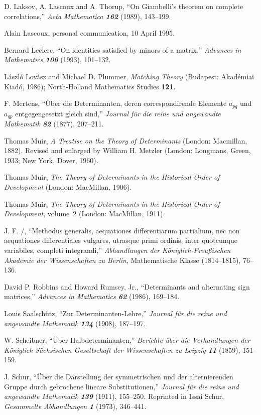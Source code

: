 {\bib
[\LLT]
D. Laksov, A. Lascoux and A. Thorup, ``On Giambelli's theorem on complete
correlations,'' {\sl Acta Mathematica\/ \bf162} (1989), 143--199.

\bib
[\Lasc] Alain Lascoux, personal communication, 10 April 1995.

\bib
[\Lec] 
Bernard Leclerc, ``On identities satisfied by minors of a matrix,''
{\sl Advances in Mathematics\/ \bf100} (1993), 101--132.

\bib
[\LP]
L\'aszl\'o Lov\'asz and Michael D. Plummer, {\sl Matching Theory\/} (Budapest:
Akad\'emiai Kiad\'o, 1986); North-Holland Mathematics Studies {\bf 121}.

\bib
[\Mert]
F. Mertens, ``\"Uber die Determinanten, deren correspondirende Elemente
$a_{pq}$ und~$a_{qp}$ ent\-gegen\-gesetzt gleich sind,'' 
{\sl Journal f\"ur die reine und angewandte Mathematik\/
\bf 82} (1877), 207--211.

\bib
[\Muirtreat]
Thomas Muir, {\sl A Treatise on the Theory of Determinants\/} (London:
Macmillan, 1882). Revised and enlarged by William H. Metzler (London:
Longmans, Green, 1933; New York, Dover, 1960).

\bib
[\Muir]
Thomas Muir, {\sl The Theory of Determinants in the Historical Order of
Development\/} (London: MacMillan, 1906).

\bib
[\Muirtwo]
Thomas Muir, {\sl The Theory of Determinants in the Historical Order of
Development}, volume~2 (London: MacMillan, 1911).

\bib
[\Pf]
J. F. \Pfaff/, ``Methodus generalis, aequationes differentiarum partialium, nec
non aequationes differentiales vulgares, utrasque primi ordinis, inter
quotcunque variabiles, completi integrandi,'' {\sl Abhandlungen der
K\"oniglich-Preu{\ss}ischen Akademie der Wissenschaften zu Berlin},
Mathematische Klasse (1814--1815), 76--136.

\bib
[\RR]
David P. Robbins and Howard Rumsey, Jr., ``Determinants and alternating sign
matrices,'' {\sl Advances in Mathematics\/ \bf 62} (1986), 169--184.

\bib
[\Saal]
Louis Saalsch\"utz, ``Zur Determinanten-Lehre,''
{\sl Journal f\"ur die reine und angewandte Mathematik\/
\bf 134} (1908), 187--197.

\bib
[\Scheib]
W. Scheibner, ``\"Uber Halbdeterminanten,'' {\sl Berichte \"uber die
Verhandlungen der K\"oniglich S\"achsischen Gesellschaft der Wissenschaften zu
Leipzig\/ \bf 11} (1859), 151--159.

\bib
[\Schur]
J. Schur, ``\"Uber die Darstellung der symmetrischen und der alternierenden
Gruppe durch gebrochene lineare Substitutionen,'' {\sl Journal f\"ur die reine
und angewandte Mathematik\/ \bf139} (1911), 155--250. Reprinted in Issai
Schur, {\sl Gesammelte Abhandlungen\/ \bf1} (1973), 346--441.

}
